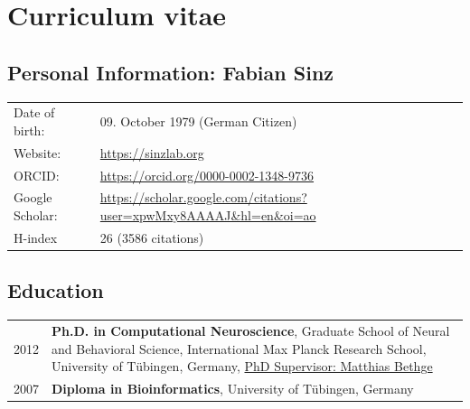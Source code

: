\documentclass[COG,11pt]{ercgrant}
\begin{document}
% 	
% 	

\newpage
\section{Curriculum vitae}

\subsection{Personal Information: Fabian Sinz}
\begin{tabular}{p{3cm}l}
	Date of birth:         & 09. October 1979 (German Citizen)     \\
	Website:               & \url{https://sinzlab.org}     \\
	ORCID:                 &  \url{https://orcid.org/0000-0002-1348-9736}      \\
        Google Scholar:         & \url{https://scholar.google.com/citations?user=xpwMxy8AAAAJ&hl=en&oi=ao}\\
        H-index  & 26 (3586 citations)
\end{tabular}

\subsection{Education}
\begin{tabular}{p{3cm}p{12cm}}
	2012
	 & \textbf{Ph.D. in Computational Neuroscience}, Graduate School of Neural and Behavioral Science, International Max Planck Research School, University of Tübingen, Germany, \underline{PhD Supervisor: Matthias Bethge}\\
    2007 & \textbf{Diploma in Bioinformatics}, University of Tübingen, Germany
\end{tabular}
\end{document}
